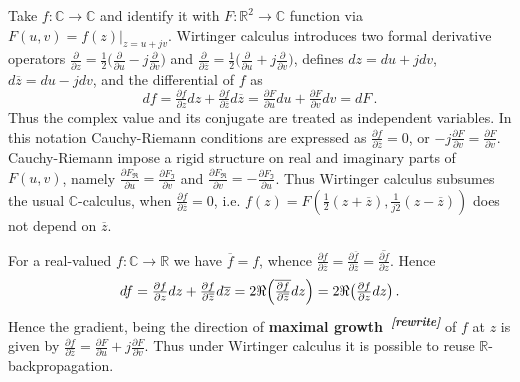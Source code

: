 \documentclass[a4paper,10pt]{article}
\newcommand{\attn}[2]{\textbf{\color{red} #2~\textsuperscript{\textit{[#1]}}}}
\newcommand{\rewrite}[1]{\attn{rewrite}{#1}}
\newcommand{\real}{\mathbb{R}}
\newcommand{\cplx}{\mathbb{C}}
\newcommand{\conj}[1]{\overline{#1}}
\begin{document}
Take $f\colon \cplx \to \cplx$ and identify it with $F\colon \real^2 \to \cplx$ function
via $F(u, v) = f(z)\vert_{z=u + j v}$. Wirtinger calculus introduces two formal derivative
operators
$
  \tfrac{\partial}{\partial z}
    = \tfrac12 \bigl(
      \tfrac{\partial}{\partial u}
      - j \tfrac{\partial}{\partial v}
    \bigr)
$ and $
  \tfrac{\partial}{\partial \conj{z}}
    = \tfrac12 \bigl(
      \tfrac{\partial}{\partial u}
      + j \tfrac{\partial}{\partial v}
    \bigr)
$, defines $dz = du + j dv$, $d\conj{z} = du - j dv$, and the differential of $f$ as
$$
df = \tfrac{\partial f}{\partial z} dz
    + \tfrac{\partial f}{\partial \conj{z}} d\conj{z}
   = \tfrac{\partial F}{\partial u} du
     + \tfrac{\partial F}{\partial v} dv
   = dF
  \,. $$
Thus the complex value and its conjugate are treated as independent variables. In this notation
Cauchy-Riemann conditions are expressed as $
  \tfrac{\partial f}{\partial \conj{z}} = 0
$, or $
  -j\tfrac{\partial F}{\partial v} = \tfrac{\partial F}{\partial v}
$. Cauchy-Riemann impose a rigid structure on real and imaginary parts of $F(u, v)$, namely $
  \tfrac{\partial F_{\Re }}{\partial u} = \tfrac{\partial F_{\Im }}{\partial v}
$ and $
  \tfrac{\partial F_{\Re }}{\partial v} = - \tfrac{\partial F_{\Im }}{\partial u}
$. Thus Wirtinger calculus subsumes the usual $\cplx$-calculus, when $
  \tfrac{\partial f}{\partial \conj{z}} = 0
$, i.e. $
  f(z)
    = F(\tfrac12 (z + \conj{z}), \tfrac1{j 2} (z - \conj{z}))
$ does not depend on $\conj{z}$.

For a real-valued $f\colon \cplx \to \real$ we have $\conj{f} = f$, whence $
  \tfrac{\partial f}{\partial \conj{z}}
    = \tfrac{\partial \conj{f}}{\partial \conj{z}}
    = \conj{\tfrac{\partial f}{\partial z}}
$. Hence
$$
df
  = \tfrac{\partial f}{\partial z} dz
    + \tfrac{\partial f}{\partial \conj{z}} d\conj{z}
  = 2 \Re \Bigl(
    \conj{\tfrac{\partial f}{\partial \conj{z}}} dz
  \Bigr)
  = 2 \Re \bigl(
    \tfrac{\partial f}{\partial z} dz
  \bigr)
  \,. $$
Hence the gradient, being the direction of \rewrite{maximal growth} of $f$ at $z$ is given by $
  \tfrac{\partial f}{\partial \conj{z}}
    = \tfrac{\partial F}{\partial u}
      + j \tfrac{\partial F}{\partial v}
$. Thus under Wirtinger calculus it is possible to reuse $\real$-backpropagation.
\end{document}
